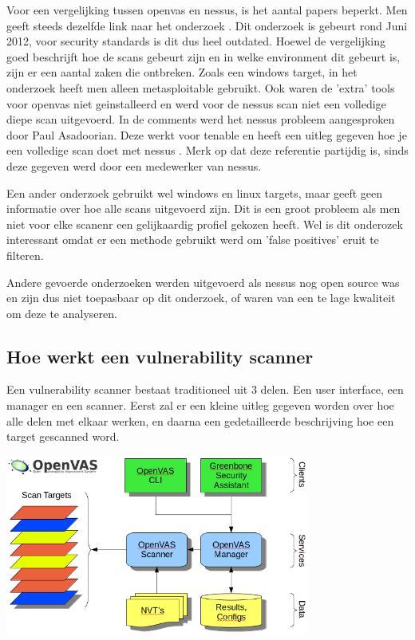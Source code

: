 Voor een vergelijking tussen openvas en nessus, is het aantal papers beperkt. Men geeft steeds dezelfde link naar het onderzoek \textcite{Hackertarget}. Dit onderzoek is gebeurt rond Juni 2012, voor security standards is dit dus heel outdated. Hoewel de vergelijking goed beschrijft hoe de scans gebeurt zijn en in welke environment dit gebeurt is, zijn er een aantal zaken die ontbreken. Zoals een windows target, in het onderzoek heeft men alleen metasploitable gebruikt. Ook waren de 'extra' tools voor openvas niet geinstalleerd en werd voor de nessus scan niet een volledige diepe scan uitgevoerd. In de comments werd het nessus probleem aangesproken door Paul Asadoorian. Deze werkt voor tenable en heeft een uitleg gegeven hoe je een volledige scan doet met nessus \textcite{Securityweekly}. Merk op dat deze referentie partijdig is, sinds deze gegeven werd door een medewerker van nessus.

Een ander onderzoek \textcite{Rageweb} gebruikt wel windows en linux targets, maar geeft geen informatie over hoe alle scans uitgevoerd zijn. Dit is een groot probleem als men niet voor elke scanenr een gelijkaardig profiel gekozen heeft. Wel is dit onderozek interessant omdat er een methode gebruikt werd om 'false positives' eruit te filteren.

Andere gevoerde onderzoeken werden uitgevoerd als nessus nog open source was en zijn dus niet toepasbaar op dit onderzoek, of waren van een te lage kwaliteit om deze te analyseren. 

\subsection{Hoe werkt een vulnerability scanner}


Een vulnerability scanner bestaat traditioneel uit 3 delen. Een user interface, een manager en een scanner. Eerst zal er een kleine uitleg gegeven worden over hoe alle delen met elkaar werken, en daarna een gedetailleerde beschrijving hoe een target gescanned word.
 
 
\includegraphics[width=10.0cm]{img/Openvas-structuur.png} \textcite{Openvas-about}
 
